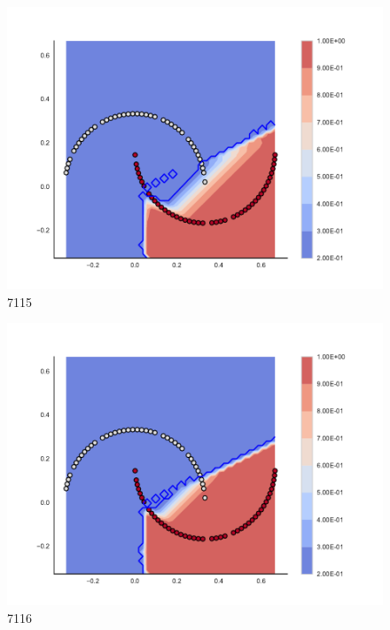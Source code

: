 \begin{subfigure}[b]{0.09\textwidth}
    \includegraphics[clip, trim=2.35cm 1.75cm 4.5cm 0cm,width=\textwidth]{img/convergence/7115.pdf}
    \caption{7115}
    \label{fig:convergence_7115}
\end{subfigure}
%
\begin{subfigure}[b]{0.09\textwidth}
    \includegraphics[clip, trim=2.35cm 1.75cm 4.5cm 0cm,width=\textwidth]{img/convergence/7116.pdf}
    \caption{7116}
    \label{fig:convergence_7116}
\end{subfigure}
%

